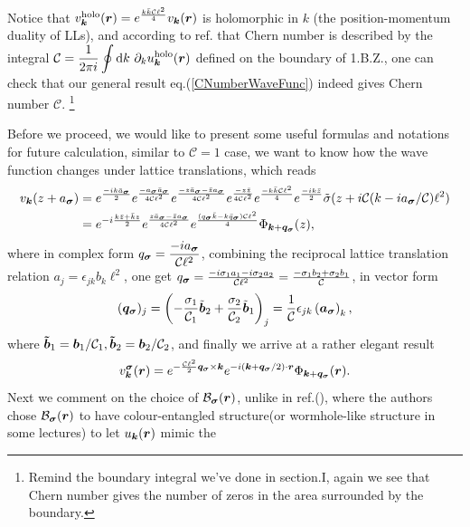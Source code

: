 \documentclass[%
nofootinbib,
 amsmath,amssymb,
 aps,onecolumn,
prb
]{revtex4-2}
\newcommand{\zz}{\bar{z}}
\newcommand{\tilsig}{\tilde{\sigma}}
\newcommand{\mB}{\mathcal{B}}
\newcommand{\mC}{\mathcal{C}}
\newcommand{\vsig}{\vb*{\sigma}}
\begin{document}
Notice that $v^{\text{holo}}_{\vb*{k}}(\vb*{r})=e^{\frac{k\bar{k}\mC\ell^2}{4}}v_{\vb*{k}}(\vb*{r})$ is holomorphic in $k$ (the position-momentum duality of LLs), and according to ref.\cite{2021JieWangPRL} that Chern number is described by the integral 
$\mC=\displaystyle\frac{1}{2\pi i}\oint \dd k\ \partial_k u^{\text{holo}}_{\vb*{k}}(\vb*{r})$ defined on the boundary of 1.B.Z., one can check that our general result eq.(\ref{CNumberWaveFunc}) indeed gives Chern number $\mC$. \footnote{Remind the boundary integral we've done in section.I, again we see that Chern number gives the number of zeros in the area surrounded by the boundary.}\par 
Before we proceed, we would like to present some useful formulas and notations for future calculation, similar to $\mC=1$ case, we want to know how the wave function changes under lattice translations, which reads 
\begin{align}
    v_{\vb*{k}}(z+a_{\vsig})&=e^{\frac{-ik\bar{a}_{\vsig}}{2}}e^{\frac{-a_{\vsig}\bar{a}_{\vsig}}{4\mC\ell^2}}e^{\frac{-z\bar{a}_{\vsig}-\zz a_{\vsig}}{4\mC\ell^2}}
                            e^{\frac{-z\zz}{4\mC\ell^2}}e^{\frac{-k\bar{k}\mC\ell^2}{4}}e^{\frac{-ik\bar{z}}{2}}\tilsig(z+i\mC (k-ia_{\vsig}/\mC)\ell^2) \nonumber\\ 
                            &=e^{-i\frac{k\zz+\bar{k}z}{2}}e^{\frac{z\bar{a}_{\vsig}-\zz a_{\vsig}}{4\mC\ell^2}}e^{\frac{(q_{\vsig}\bar{k}-k\bar{q}_{\vsig})\mC\ell^2}{4}}\Phi_{\vb*{k}+\vb*{q}_{\vsig}}(z),
\end{align}
where in complex form $q_{\vsig}=\displaystyle\frac{-ia_{\vsig}}{\mC\ell^2}$, combining the reciprocal lattice translation relation $a_j=\epsilon_{jk}b_k\ell^2$, one get 
$q_{\vsig}=\frac{-i\sigma_1a_1-i\sigma_2a_2}{\mC\ell^2}=\frac{-\sigma_1b_2+\sigma_2b_1}{\mC}$, in vector form 
\begin{equation}
    (\vb*{q}_{\vsig})_j=\left(-\frac{\sigma_1}{\mC_1}\tilde{\vb*{b}}_2+\frac{\sigma_2}{\mC_2}\tilde{\vb*{b}}_1\right)_j=\displaystyle\frac{1}{\mC}\epsilon_{jk}\left(\vb*{a}_{\vsig}\right)_k,
\end{equation}
where $\vb*{\tilde{b}}_1=\vb*{b}_1/\mC_1, \vb*{\tilde{b}}_2=\vb*{b}_2/\mC_2$, and finally we arrive at a rather elegant result 
\begin{equation}
    v^{\vsig}_{\vb*{k}}(\vb*{r})=e^{-\frac{\mC\ell^2}{2}\vb*{q}_{\vsig}\times\vb*{k}}e^{-i(\vb*{k}+\vb*{q}_{\vsig}/2)\cdot\vb*{r}}\Phi_{\vb*{k}+\vb*{q}_{\vsig}}(\vb*{r}).
\end{equation}
Next we comment on the choice of $\mB_{\vsig}(\vb*{r})$, unlike in ref.(\cite{JieWang2022PRR}), where the authors chose $\mB_{\vsig}(\vb*{r})$ to have colour-entangled structure(or wormhole-like structure in some lectures) to let $u_{\vb*{k}}(\vb*{r})$ mimic the 
\end{document}
